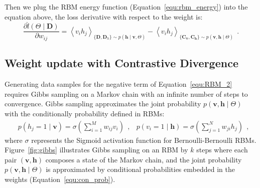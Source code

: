 Then we plug the RBM energy function (Equation~\ref{equ:rbm_energy}) into the equation above, the loss derivative with respect to the weight is:
\begin{equation}
\label{equ:RBM_2}
\dfrac{\partial \hat{l} (\Theta \mid \mathbf{D})}{\partial w_{ij}} 
= \left \langle v_i h_j \right \rangle_{\{\mathbf{D}, \mathbf{D}_h\} \sim p( \mathbf{h} \mid \mathbf{v}, \Theta)}
- \left \langle  v_i h_j \right \rangle_{\{\mathbf{C_v}, \mathbf{C_h}\} \sim p( \mathbf{v}, \mathbf{h} \mid  \Theta)}~~. %
\end{equation}
\subsection{Weight update with Contrastive Divergence}
\label{sec:cd}
Generating data samples for the negative term of Equation~\ref{equ:RBM_2} requires Gibbs sampling on a Markov chain with an infinite number of steps to convergence.
Gibbs sampling approximates the joint probability $p( \mathbf{v}, \mathbf{h} \mid  \Theta)$ with the conditionally probability defined in RBMs:
\begin{equation}
\begin{aligned}
& p(h_j = 1 \mid \mathbf{v}) = \sigma(\sum_{i=1}^{M} w_{ij} v_i)~~,
& p(v_i = 1 \mid \mathbf{h}) = \sigma(\sum_{j=1}^{N} w_{ji} h_j)~~,
\end{aligned}
\label{equ:con_prob}
\end{equation} 
where $\sigma$ represents the Sigmoid activation function for Bernoulli-Bernoulli RBMs.
Figure~\ref{fig:gibbs} illustrates Gibbs sampling on an RBM by $k$ steps where each pair $(\mathbf{v}, \mathbf{h})$ composes a state of the Markov chain, and the joint probability $p( \mathbf{v}, \mathbf{h} \mid  \Theta)$ is approximated by conditional probabilities embedded in the weights (Equation~\ref{equ:con_prob}).

